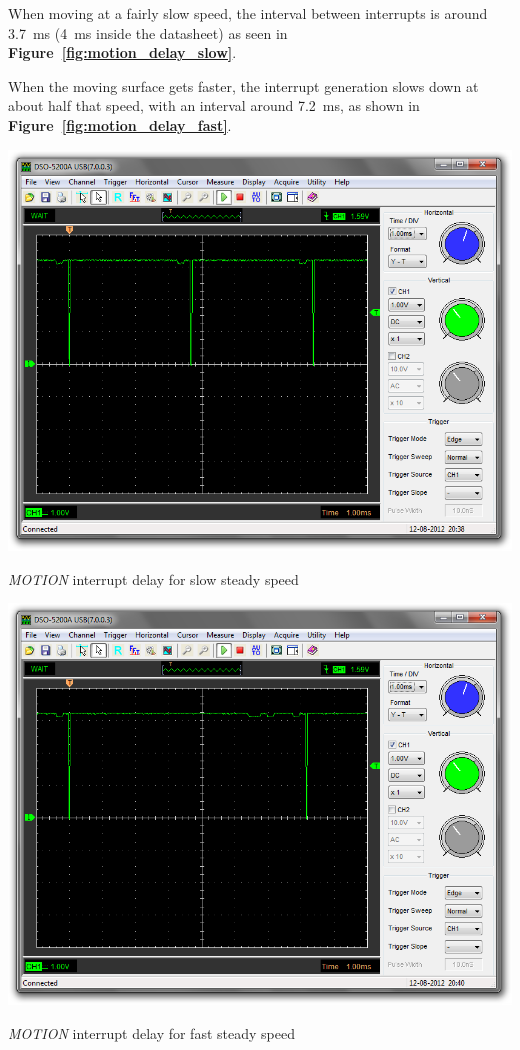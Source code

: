 \documentclass[a4paper,10pt]{article}
\makeatletter
\newenvironment{figurehere}{\def\@captype{figure}\vspace{2ex}}{\vspace{2ex}}
\newcommand{\citef}[1]{\textbf{Figure~\ref{#1}}}
\makeatother
\begin{document}
\begin{multicols}{2}
When moving at a fairly slow speed, the interval between interrupts is around
3.7~ms (4~ms inside the datasheet) as seen in \citef{fig:motion_delay_slow}.

When the moving surface gets faster, the interrupt generation slows down at
about half that speed, with an interval around 7.2~ms, as shown in
\citef{fig:motion_delay_fast}.

\begin{figurehere}
	\centering
	\includegraphics[keepaspectratio=true,width=\columnwidth]{images/motion_delay_slow.png}
	\caption{\emph{MOTION} interrupt delay for slow steady speed}
	\label{fig:motion_delay_slow}
\end{figurehere}

\begin{figurehere}
	\centering
	\includegraphics[keepaspectratio=true,width=\columnwidth]{images/motion_delay_fast.png}
	\caption{\emph{MOTION} interrupt delay for fast steady speed}
	\label{fig:motion_delay_fast}
\end{figurehere}



\end{multicols}
\end{document}
